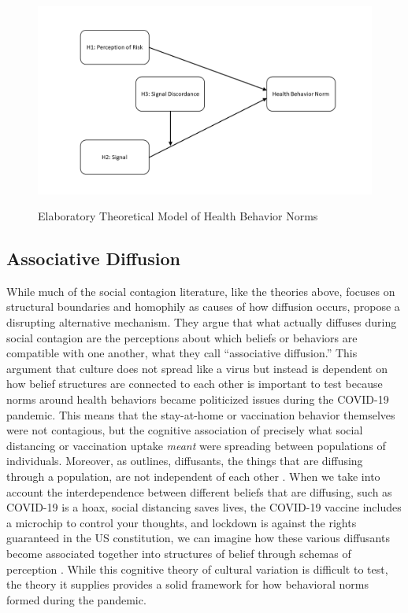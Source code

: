 \begin{figure}
{\centering \includegraphics[width=0.8\linewidth]{figs/paper3/dag}}
\caption{Elaboratory Theoretical Model of Health Behavior Norms}\label{fig:dag}
\end{figure}

\hypertarget{associative-diffusion}{\subsection{Associative Diffusion}\label{associative-diffusion}}

While much of the social contagion literature, like the theories above, focuses
on structural boundaries and homophily as causes of how diffusion occurs,
\citet{goldbergSocialContagionAssociative2018} propose a disrupting alternative
mechanism. They argue that what actually diffuses during social contagion are
the perceptions about which beliefs or behaviors are compatible with one
another, what they call ``associative diffusion.'' This argument that culture
does not spread like a virus but instead is dependent on how belief structures
are connected to each other is important to test because norms around health
behaviors became politicized issues during the COVID-19 pandemic. This means
that the stay-at-home or vaccination behavior themselves were not contagious,
but the cognitive association of precisely what social distancing or vaccination
uptake \emph{meant} were spreading between populations of individuals. Moreover,
as \citet{houghton20} outlines, diffusants, the things that are diffusing
through a population, are not independent of each other \citep{mason_etal07}.
When we take into account the interdependence between different beliefs that are
diffusing, such as COVID-19 is a hoax, social distancing saves lives, the
COVID-19 vaccine includes a microchip to control your thoughts, and lockdown is
against the rights guaranteed in the US constitution, we can imagine how these
various diffusants become associated together into structures of belief through
schemas of perception \citep{houghton20}. While this cognitive theory of
cultural variation is difficult to test, the theory it supplies provides a solid
framework for how behavioral norms formed during the pandemic.

